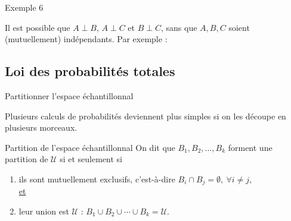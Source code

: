 \documentclass{BeamerTemplate}
\newcommand{\cibleReponse}{}
\newcommand{\lienreponse}[1]{\gdef\cibleReponse{#1}}
\begin{document}
\begin{frame}[t,label=ex6]{Exemple 6}

Il est possible que $A\perp B$, $A\perp C$ et $B\perp C$, sans que
$A,B,C$ soient (mutuellement) indépendants. Par exemple :

\begin{center}
\end{center}

\lienreponse{rep-ex1}
\end{frame}

\subsection{Loi des probabilités totales}

\begin{frame}[t]{Partitionner l'espace échantillonnal}

{\small Plusieurs calculs de probabilités deviennent plus simples si on
 les découpe en plusieurs morceaux.

 \begin{Boite}{Partition de l'espace échantillonnal}
  On dit que $B_1,B_2,\ldots,B_k$ forment une \alert{partition
  de $\mathcal{U}$} si et seulement si
  \begin{enumerate}
   \item ils sont mutuellement exclusifs, c'est-à-dire $B_i\cap B_j=\emptyset,\ \forall i\neq j$,\\

   \underline{et}
   \item leur union est $\mathcal{U}$ : $B_1\cup B_2\cup \cdots\cup B_k=\mathcal{U}$.
  \end{enumerate}
 \end{Boite}
}
\end{frame}
\end{document}
